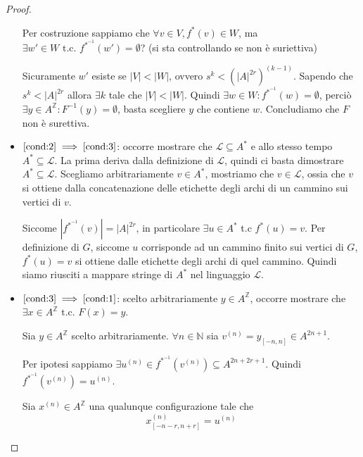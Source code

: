 \begin{teorema}
\begin{proof}
\begin{itemize}
                  Per costruzione sappiamo che $\forall v\in V, f^{\ast}(v)\in W$, ma $\exists
                      w'\in W\text{ t.c. } f^{\ast^{-1}} (w')= \emptyset$? (si sta controllando se non è suriettiva)

                  Sicuramente $w'$ esiste se $|V|<|W|$, ovvero  $s^k<(|A|^{2r})^{(k-1)}$.
                  Sapendo che $s^k < |A|^{2r}$ allora $\exists k$ tale che  $|V|<|W|$.
                  Quindi $\exists w \in W: f^{\ast^{-1}} (w) =\emptyset$, perciò
                  $\exists y \in A^{\mathbb{Z}}: F^{-1}(y) = \emptyset$, basta scegliere
                  $y$ che contiene $w$. Concludiamo che $F$ non è surettiva.

            \item $\ref{cond:2}\implies \ref{cond:3}$: occorre mostrare che $\mathcal{L} \subseteq A^\ast$
                  e allo stesso tempo $ A^\ast \subseteq\mathcal{L}$. La prima deriva
                  dalla definizione di $\mathcal{L}$, quindi ci basta dimostrare
                  $A^\ast \subseteq\mathcal{L}$. Scegliamo arbitrariamente $v\in  A^\ast$,
                  mostriamo che $v\in \mathcal{L}$, ossia che $v$ si ottiene dalla concatenazione
                  delle etichette degli archi di un cammino sui vertici di $v$.

                  Siccome $|f^{\ast^{-1}}(v)| = |A|^{2r}$, in particolare $\exists u \in A^\ast$
                  t.c $f^\ast(u) = v$. Per definizione di $G$, siccome $u$ corrisponde
                  ad un cammino finito sui vertici di $G$, $f^\ast(u)=v$ si ottiene dalle etichette
                  degli archi di quel cammino. Quindi siamo riusciti a mappare 
                  stringe di $A^\ast$ nel linguaggio $\mathcal{L}$.
                  
            \item $\ref{cond:3}\implies \ref{cond:1}$: scelto arbitrariamente $y\in A^\mathbb{Z}$,
                  occorre mostrare che $\exists x\in A^\mathbb{Z} \text{ t.c. } F(x) =y$.

                  Sia $y\in A^\mathbb{Z}$ scelto arbitrariamente. $\forall n\in \mathbb{N}$
                  sia $v^{(n)} = y_{[-n,n]}\in A^{2n+1}$.

                  Per ipotesi sappiamo $\exists u^{(n)}\in f^{\ast^{-1}}(v^{(n)})\subseteq A^{2n+2r+1}$.
                  Quindi $f^{\ast^{-1}}(v^{(n)}) = u^{(n)}$.

                  Sia $x^{(n)}\in A^\mathbb{Z}$ una qualunque configurazione tale che
                  $$x^{(n)}_{[-n-r,n+r]} = u^{(n)}$$


\end{itemize}
\end{proof}
\end{teorema}

